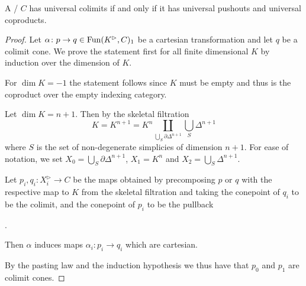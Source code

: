 \begin{lemma}\label{lem:univColimIffUnivPoAndCoprod}
    A \inftycat/ $C$ has universal colimits if and only if it has universal pushouts and universal coproducts.
    \begin{proof}
        Let $\alpha\colon p\to q\in\operatorname{Fun}(K^{\rhd},C)_1$ be a cartesian transformation and let $q$ be a colimit cone. 
        We prove the statement first for all finite dimensional $K$ by induction over the dimension of $K$.

        For $\dim K=-1$ the statement follows since $K$ must be empty and thus is the coproduct over the empty indexing category.
        
        Let $\dim K=n+1$. 
        Then by the skeletal filtration
        \begin{equation*}
            K=K^{n+1}=K^n\coprod\limits_{\bigcup\limits_S \partial\Delta^{n+1}}\bigcup_S \Delta^{n+1}
        \end{equation*}
        where $S$ is the set of non-degenerate simplicies of dimension $n+1$.
        For ease of notation, we set $X_{0}=\bigcup\limits_S \partial\Delta^{n+1}$, $X_1=K^n$ and $X_2=\bigcup\limits_S \Delta^{n+1}$.

        Let $p_i,q_i\colon X_i^{\rhd}\to C$ be the maps obtained by precomposing $p$ or $q$ with the respective map to $K$ from the skeletal filtration and taking the conepoint of $q_i$ to be the colimit, and the conepoint of $p_i$ to be the pullback %
        \begin{center}
            \;.
        \end{center}
        Then $\alpha$ induces maps $\alpha_i\colon p_i\to q_i$ which are cartesian. %

        By the pasting law and the induction hypothesis we thus have that $p_0$ and $p_1$ are colimit cones.


\end{proof}
\end{lemma}
